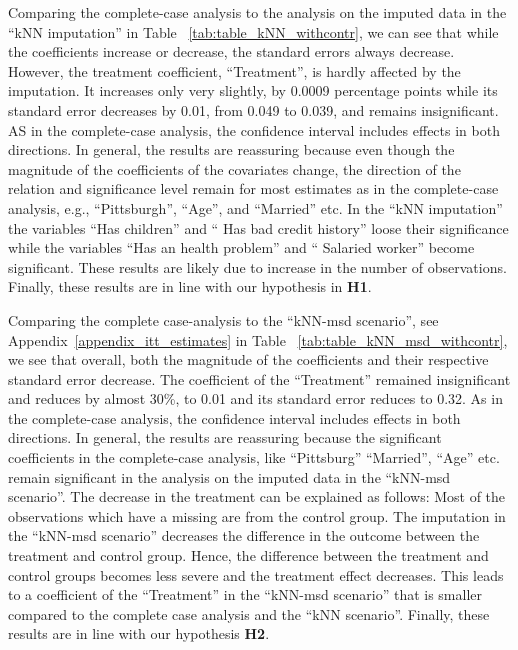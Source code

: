Comparing the complete-case analysis to the analysis on the imputed data in the ``kNN imputation'' in Table ~\ref{tab:table_kNN_withcontr}, we can see that while the coefficients increase or decrease, the standard errors always decrease. However, the treatment coefficient, ``Treatment'', is hardly affected by the imputation. It increases only very slightly, by 0.0009 percentage points while its standard error decreases by 0.01, from 0.049 to 0.039, and remains insignificant. AS in the complete-case analysis, the confidence interval includes effects in both directions. In general, the results are reassuring because even though the magnitude of the coefficients of the covariates change, the direction of the relation and significance level remain for most estimates as in the complete-case analysis, e.g., ``Pittsburgh'', ``Age'', and ``Married'' etc. In the ``kNN imputation'' the variables ``Has children'' and `` Has bad credit history'' loose their significance while the variables ``Has an health problem'' and `` Salaried worker'' become significant. These results are likely due to increase in the number of observations. Finally, these results are in line with our hypothesis in \textbf{H1}.

Comparing the complete case-analysis to the ``kNN-msd scenario'', see Appendix~\ref{appendix_itt_estimates} in Table ~\ref{tab:table_kNN_msd_withcontr}, we see that overall, both the magnitude of the coefficients and their respective standard error decrease. The coefficient of the ``Treatment'' remained insignificant and reduces by almost 30\%, to 0.01 and its standard error reduces to 0.32. As in the complete-case analysis, the confidence interval includes effects in both directions. In general, the results are reassuring because the significant coefficients in the complete-case analysis, like ``Pittsburg'' ``Married'', ``Age'' etc. remain significant in the analysis on the imputed data in the ``kNN-msd scenario''. The decrease in the treatment can be explained as follows: Most of the observations which have a missing are from the control group. The imputation in the ``kNN-msd scenario'' decreases the difference in the outcome between the treatment and control group. Hence, the difference between the treatment and control groups becomes less severe and the treatment effect decreases. This leads to a coefficient of the ``Treatment'' in the ``kNN-msd scenario'' that is smaller compared to the complete case analysis and the ``kNN scenario''. Finally, these results are in line with our hypothesis \textbf{H2}.

